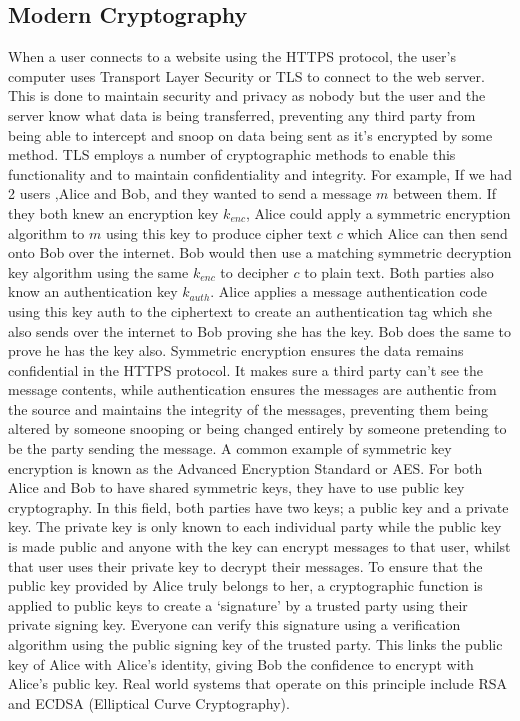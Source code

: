 \documentclass[10pt,a4paper]{article}
\begin{document}
\subsection{Modern Cryptography}
When a user connects to a website using the HTTPS protocol, the user's computer uses Transport Layer Security or TLS to connect to the web server. This is done to maintain security and privacy as nobody but the user and the server know what data is being transferred, preventing any third party from being able to intercept and snoop on data being sent as it's encrypted by some method. TLS employs a number of cryptographic methods to enable this functionality and to maintain confidentiality and integrity.
\newline
\newline
For example, If we had 2 users ,Alice and Bob, and they wanted to send a message \(m\) between them. If they both knew an encryption key \(k_{enc}\), Alice could apply a symmetric encryption algorithm to \(m\) using this key to produce cipher text \(c\) which Alice can then send onto Bob over the internet. Bob would then use a matching symmetric decryption key algorithm using the same \(k_{enc}\) to decipher \(c\) to plain text. Both parties also know an authentication key \(k_{auth}\). Alice applies a message authentication code using this key auth to the ciphertext to create an authentication tag which she also sends over the internet to Bob proving she has the key. Bob does the same to prove he has the key also. Symmetric encryption ensures the data remains confidential in the HTTPS protocol. It makes sure a third party can't see the message contents, while authentication ensures the messages are authentic from the source and maintains the integrity of the messages, preventing them being altered by someone snooping or being changed entirely by someone pretending to be the party sending the message. A common example of symmetric key encryption is known as the Advanced Encryption Standard or AES.
\newline For both Alice and Bob to have shared symmetric keys, they have to use public key cryptography. In this field, both parties have two keys; a public key and a private key. The private key is only known to each individual party while the public key is made public and anyone with the key can encrypt messages to that user, whilst that user uses their private key to decrypt their messages.
\newline To ensure that the public key provided by Alice truly belongs to her,  a cryptographic function is applied to public keys to create a `signature' by a trusted party using their private signing key. Everyone can verify this signature using a verification algorithm using the public signing key of the trusted party. This links the public key of Alice with Alice's identity, giving Bob the confidence to encrypt with Alice's public key. Real world systems that operate on this principle include RSA and ECDSA (Elliptical Curve Cryptography).
\end{document}
